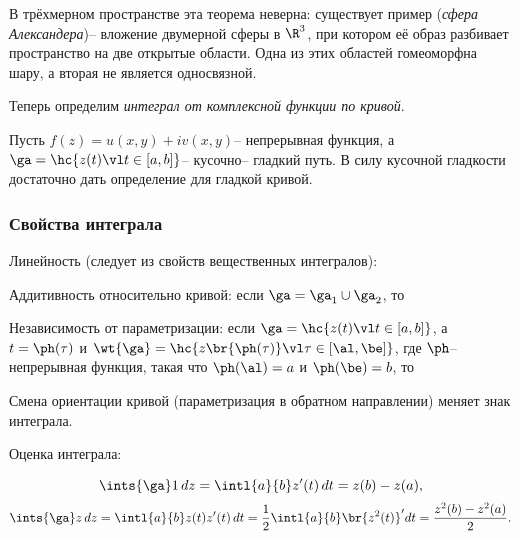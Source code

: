 \documentclass[a4paper]{article}
\begin{document}
\begin{note}
В трёхмерном пространстве эта теорема неверна: существует пример (\emph{сфера Александера})-- вложение
двумерной сферы в $\R^3$, при котором её образ разбивает пространство на две  открытые области. Одна из этих областей
гомеоморфна шару, а вторая не является односвязной.
\end{note}

Теперь определим \emph{интеграл от комплексной функции по кривой}.

\begin{df}
Пусть $f(z)=u(x,y)+iv(x,y)$-- непрерывная функция, а $\ga=\hc{z(t) \vl t \in [a,b]}$-- кусочно-- гладкий путь.
В силу кусочной гладкости достаточно дать определение для гладкой кривой.


\end{df}

\subsubsection{Свойства интеграла}

 Линейность (следует из свойств вещественных интегралов):


 Аддитивность относительно кривой: если $\ga=\ga_1\cup\ga_2$, то


 Независимость от параметризации: если $\ga= \hc{z(t) \vl t \in [a,b]}$, а
$t=\ph(\tau)$ и $\wt{\ga}=\hc{z\br{\ph(\tau)} \vl \tau \in [\al, \be]}$, где $\ph$--
непрерывная функция, такая что $\ph(\al)=a$ и $\ph(\be)=b$, то 

 Смена ориентации кривой (параметризация в обратном направлении) меняет знак интеграла.

 Оценка  интеграла:


\begin{ex}
$$\ints{\ga}1\,dz=\intl{a}{b}z'(t)\,dt=z(b)-z(a),$$
$$\ints{\ga}z\,dz=\intl{a}{b}z(t)z'(t)\,dt = \frac12\intl{a}{b}\br{z^2(t)}'dt=\frac{z^2(b)-z^2(a)}{2}.$$
\end{ex}
\end{document}
